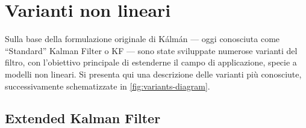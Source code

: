 \documentclass[12pt,a4paper,openright,twoside]{book}
\begin{document}
\section{Varianti non lineari}

Sulla base della formulazione originale di Kálmán --- oggi conosciuta come ``Standard'' Kalman Filter o KF --- sono state sviluppate numerose varianti del filtro, con l'obiettivo principale di estenderne il campo di applicazione, specie a modelli non lineari. Si presenta qui una descrizione delle varianti più conosciute, successivamente schematizzate in \cref{fig:variants-diagram}.

\subsection{Extended Kalman Filter}
\end{document}
